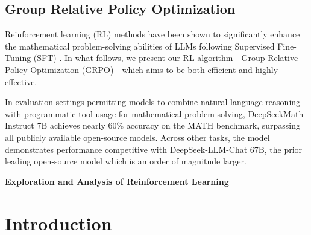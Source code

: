 \begin{itemize}[topsep=0pt]
\begin{itemize}[topsep=0pt]
\subsection{Group Relative Policy Optimization} Reinforcement learning (RL) methods have been shown to significantly enhance the mathematical problem-solving abilities of LLMs following Supervised Fine-Tuning (SFT) \citep{wang2023math,wizardmath}. In what follows, we present our RL algorithm—Group Relative Policy Optimization (GRPO)—which aims to be both efficient and highly effective.

In evaluation settings permitting models to combine natural language reasoning with programmatic tool usage for mathematical problem solving, DeepSeekMath-Instruct 7B achieves nearly 60\% accuracy on the MATH benchmark, surpassing all publicly available open-source models. Across other tasks, the model demonstrates performance competitive with DeepSeek-LLM-Chat 67B, the prior leading open-source model which is an order of magnitude larger.

\textbf{Exploration and Analysis of Reinforcement Learning}

\section{Introduction}


\begin{abstract}
Mathematical reasoning remains a formidable obstacle for language models, given its highly structured and intricate requirements. Here, we present DeepSeekMath~7B, an extension of DeepSeek-Coder-Base-v1.5 7B that is further pre-trained on 120B mathematics-related tokens extracted from Common Crawl, as well as associated data in natural language and programming code. DeepSeekMath~7B attains a noteworthy 51.7\% accuracy on the MATH competition benchmark without leveraging auxiliary toolkits or ensemble voting, nearing the capabilities exhibited by Gemini-Ultra and GPT-4. Additionally, utilizing self-consistency with 64 generated samples, DeepSeekMath~7B reaches a performance of 60.9\% on the same benchmark. The improved mathematical reasoning proficiency of DeepSeekMath~can be primarily attributed to two innovations: first, the exploitation of publicly accessible web resources via a precisely designed data curation process; second, the deployment of Group Relative Policy Optimization (GRPO), an adaptation of Proximal Policy Optimization (PPO), which simultaneously strengthens mathematical problem-solving skills and enhances PPO’s memory efficiency.
\end{abstract}


\end{itemize}
\end{itemize}
